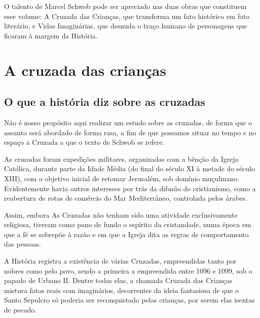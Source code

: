 \documentclass[12pt]{extarticle}
\begin{document}
O talento de Marcel Schwob pode ser apreciado nas duas obras que
constituem esse volume: A Cruzada das Crianças, que transforma um fato
histórico em fato literário, e Vidas Imaginárias, que desnuda o traço
humano de personagens que ficaram à margem da História.

\section{A cruzada das crianças}


\subsection{O que a história diz sobre as cruzadas}

Não é nosso propósito aqui realizar um estudo sobre as cruzadas, de
forma que o assunto será abordado de forma rasa, a fim de que possamos
situar no tempo e no espaço a Cruzada a que o texto de Schwob se refere.

As cruzadas foram expedições militares, organizadas com a bênção da
Igreja Católica, durante parte da Idade Média (do final do século XI à
metade do século XIII), com o objetivo inicial de retomar Jerusalém, sob
domínio muçulmano. Evidentemente havia outros interesses por trás da
difusão do cristianismo, como a reabertura de rotas de comércio do Mar
Mediterrâneo, controlada pelos árabes.




Assim, embora As Cruzadas não tenham sido uma atividade exclusivamente
religiosa, tiveram como pano de fundo o espírito da cristandade, numa
época em que a fé se sobrepõe à razão e em que a Igreja dita as regras
de comportamento das pessoas.

A História registra a existência de várias Cruzadas, empreendidas tanto
por nobres como pelo povo, sendo a primeira a empreendida entre 1096 e
1099, sob o papado de Urbano II. Dentre todas elas, a chamada Cruzada
das Crianças mistura fatos reais com imaginários, decorrentes da ideia
fantasiosa de que o Santo Sepulcro só poderia ser reconquistado pelas
crianças, por serem elas isentas de pecado.


\end{document}
